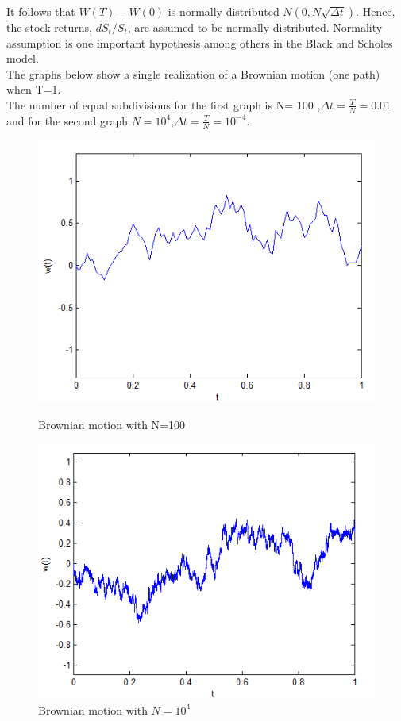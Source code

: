 \documentclass[12pt]{report}
\begin{document}
  It follows that $W(T)-W(0)$ is normally distributed $N(0,N\sqrt{\Delta t})$.  Hence, the stock returns, $dS_t/S_t$, are assumed to be normally distributed. Normality assumption is one important hypothesis among others in the Black and Scholes model.\\

The graphs below show a single realization of a Brownian motion (one path) when T=1.\\
The number of equal subdivisions for the first graph is N= 100 ,$\Delta t=\frac{T}{N}=0.01$ and for the second graph $N=10^4$,$\Delta t=\frac{T}{N}=10^{-4}$.

\begin{figure}[!htb]
  \includegraphics[width=\linewidth]{brownian.png}
\caption{Brownian motion with N=100}
\endminipage\hfill
{}
  \includegraphics[width=\linewidth]{brownianN.png}
  \caption{Brownian motion with $N=10^4$}
\endminipage\hfill
\end{figure}
\end{document}

